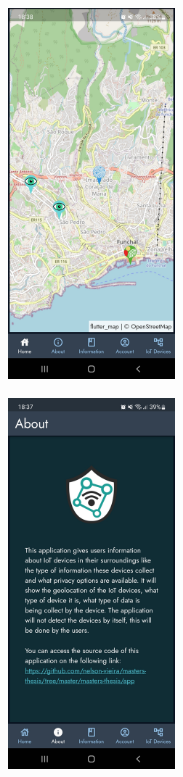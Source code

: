 \begin{figure}[H]
    \centering
    \begin{subfigure}{0.30\textwidth}
        \centering
        \includegraphics[width=125pt]{../assets/images/live_homepage.jpg}
        \caption{}
        \label{fig:livehome}
    \end{subfigure}
    \begin{subfigure}{0.30\textwidth}
        \centering
        \includegraphics[width=125pt]{../assets/images/live_about.jpg}
        \caption{}
        \label{fig:liveabout}
    \end{subfigure}
    \begin{subfigure}{0.30\textwidth}
        \centering

\end{subfigure}
\end{figure}

